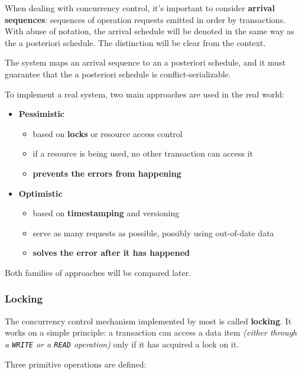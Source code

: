 \documentclass[english]{article}
\begin{document}
When dealing with concurrency control, it's important to consider \textbf{arrival sequences}: sequences of operation requests emitted in order by transactions.
With abuse of notation, the arrival schedule will be denoted in the same way as the a posteriori schedule.
The distinction will be clear from the context.

The \cc system maps an arrival sequence to an a posteriori schedule, and it must guarantee that the a posteriori schedule is conflict-serializable.

\bigskip
To implement a real \cc system, two main approaches are used in the real world:

\begin{itemize}
  \item \textbf{Pessimistic}
        \begin{itemize}
          \item based on \textbf{locks} or resource access control
          \item if a resource is being used, no other transaction can access it
          \item \textbf{prevents the errors from happening}
        \end{itemize}
  \item \textbf{Optimistic}
        \begin{itemize}
          \item based on \textbf{timestamping} and versioning
          \item serve as many requests as possible, possibly using out-of-date data
          \item \textbf{solves the error after it has happened}
        \end{itemize}
\end{itemize}

Both families of approaches will be compared later.

\subsubsection{Locking}

The concurrency control mechanism implemented by most \dbms is called \textbf{locking}.
It works on a simple principle: a transaction can access a data item \textit{(either through a \texttt{WRITE} or a \texttt{READ} operation)} only if it has acquired a lock on it.

Three primitive operations are defined:
\end{document}
